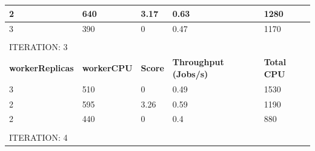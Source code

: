 \begin{table}[H]
\begin{tabular}{lllll}
\multicolumn{1}{|l|}{2}                       & \multicolumn{1}{l|}{640}                & \multicolumn{1}{l|}{3.17}           & \multicolumn{1}{l|}{0.63}                        & \multicolumn{1}{l|}{1280}               \\ \hline
\multicolumn{1}{|l|}{3}                       & \multicolumn{1}{l|}{390}                & \multicolumn{1}{l|}{0}              & \multicolumn{1}{l|}{0.47}                        & \multicolumn{1}{l|}{1170}               \\ \hline
                                              &                                         &                                     &                                                  &                                         \\
ITERATION: 3                                  &                                         &                                     &                                                  &                                         \\ \hline
\multicolumn{1}{|l|}{\textbf{workerReplicas}} & \multicolumn{1}{l|}{\textbf{workerCPU}} & \multicolumn{1}{l|}{\textbf{Score}} & \multicolumn{1}{l|}{\textbf{Throughput (Jobs/s)}} & \multicolumn{1}{l|}{\textbf{Total CPU}} \\ \hline
\multicolumn{1}{|l|}{3}                       & \multicolumn{1}{l|}{510}                & \multicolumn{1}{l|}{0}              & \multicolumn{1}{l|}{0.49}                        & \multicolumn{1}{l|}{1530}               \\ \hline
\multicolumn{1}{|l|}{2}                       & \multicolumn{1}{l|}{595}                & \multicolumn{1}{l|}{3.26}           & \multicolumn{1}{l|}{0.59}                        & \multicolumn{1}{l|}{1190}               \\ \hline
\multicolumn{1}{|l|}{2}                       & \multicolumn{1}{l|}{440}                & \multicolumn{1}{l|}{0}              & \multicolumn{1}{l|}{0.4}                         & \multicolumn{1}{l|}{880}                \\ \hline
                                              &                                         &                                     &                                                  &                                         \\
ITERATION: 4                                  &                                         &                                     &                                                  &                                         \\ \hline

\end{tabular}
\end{table}

